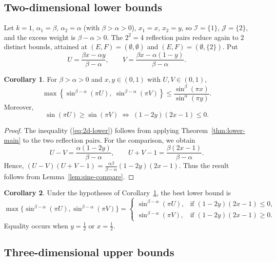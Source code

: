 \documentclass[12pt]{amsart}
\theoremstyle{definition}
\newtheorem{corollary}{Corollary}[section]
\begin{document}
\subsection{Two-dimensional lower bounds}

Let $k=1$, $\alpha_1 = \beta$, $\alpha_2 = \alpha$ (with $\beta > \alpha > 0$),
$x_1 = x$, $x_2 = y$, so $\mathcal I=\{1\}$, $\mathcal J=\{2\}$, and the excess
weight is $\beta-\alpha>0$. The $2^2=4$ reflection pairs reduce again to $2$ distinct
bounds, attained at $(E,F)=(\emptyset,\emptyset)$ and $(E,F)=(\emptyset,\{2\})$. Put
\[
U = \frac{\beta x - \alpha y}{\beta-\alpha}, \qquad
V = \frac{\beta x - \alpha(1-y)}{\beta-\alpha}.
\]

\begin{corollary}\label{cor:2d-lower}
For $\beta>\alpha>0$ and $x,y\in(0,1)$ with $U,V\in(0,1)$,
\begin{equation}\label{eq:2d-lower}
\max\left\{
  \sin^{\beta-\alpha}(\pi U),\;
  \sin^{\beta-\alpha}(\pi V)
\right\}
\leq \frac{\sin^\beta(\pi x)}{\sin^\alpha(\pi y)}.
\end{equation}
Moreover,
\[
\sin(\pi U) \ge \sin(\pi V) \;\Longleftrightarrow\; (1-2y)(2x-1) \le 0.
\]
\end{corollary}

\begin{proof}
The inequality (\ref{eq:2d-lower}) follows from applying Theorem~\ref{thm:lower-main} to the two reflection pairs. For the comparison, we obtain
\[
U - V = \frac{\alpha(1-2y)}{\beta-\alpha}, \qquad
U + V - 1 = \frac{\beta(2x-1)}{\beta-\alpha}.
\]
Hence, $(U-V)(U+V-1)=\frac{\alpha\beta}{\beta-\alpha}(1-2y)(2x-1)$. Thus the result follows from Lemma~\ref{lem:sine-compare}.
\end{proof}

\begin{corollary}\label{cor:2d-lower-best}
Under the hypotheses of Corollary~\ref{cor:2d-lower}, the best lower bound is
\[
\max\{\sin^{\beta-\alpha}(\pi U),\sin^{\beta-\alpha}(\pi V)\}
=
\begin{cases}
\sin^{\beta-\alpha}(\pi U), & \text{if } (1-2y)(2x-1) \le 0,\\
\sin^{\beta-\alpha}(\pi V), & \text{if } (1-2y)(2x-1) \ge 0.
\end{cases}
\]
Equality occurs when $y = \frac{1}{2}$ or $x = \frac{1}{2}$.
\end{corollary}

\subsection{Three-dimensional upper bounds}
\end{document}
